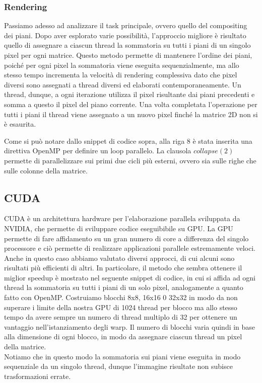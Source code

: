 \documentclass[11pt]{article}
\begin{document}
    \subsubsection{Rendering}
    Passiamo adesso ad analizzare il task principale, ovvero quello del compositing dei piani.
    Dopo aver esplorato varie possibilità, l'approccio migliore è risultato quello di assegnare a ciascun thread la sommatoria su tutti i piani di un singolo pixel per ogni matrice.
    Questo metodo permette di mantenere l'ordine dei piani, poiché per ogni pixel la sommatoria viene eseguita sequenzialmente, ma allo stesso tempo incrementa la velocità di rendering complessiva dato che pixel diversi sono assegnati a thread diversi ed elaborati contemporaneamente.
    Un thread, dunque, a ogni iterazione utilizza il pixel risultante dai piani precedenti e somma a questo il pixel del piano corrente. Una volta completata l'operazione per tutti i piani il thread viene assegnato a un nuovo pixel finché la matrice 2D non si è esaurita.
    
    Come si può notare dallo snippet di codice sopra, alla riga 8 è stata inserita una direttiva OpenMP per definire un loop parallelo. La clausola $collapse(2)$ permette di parallelizzare sui primi due cicli più esterni, ovvero sia sulle righe che sulle colonne della matrice.\\

    \subsection{CUDA}\label{subsec:cuda}
    CUDA è un architettura hardware per l'elaborazione parallela sviluppata da NVIDIA, che permette di sviluppare codice eseguibibile su GPU.
    La GPU permette di fare affidamento su un gran numero di core a differenza del singolo processore e ciò permette di realizzare applicazioni parallele estremamente veloci.\\

    Anche in questo caso abbiamo valutato diversi approcci, di cui alcuni sono risultati più efficienti di altri.
    In particolare, il metodo che sembra ottenere il miglior speedup è mostrato nel seguente snippet di codice, in cui si affida ad ogni thread la sommatoria su tutti i piani di un solo pixel, analogamente a quanto fatto con OpenMP.
    Costruiamo blocchi 8x8, 16x16 0 32x32 in modo da non superare i limite della nostra GPU di 1024 thread per blocco ma allo stesso tempo da avere sempre un numero di thread multiplo di 32 per ottenere un vantaggio nell'istanziamento degli warp.
    Il numero di blocchi varia quindi in base alla dimensione di ogni blocco, in modo da assegnare ciascun thread un pixel della matrice.\\
    
    
    Notiamo che in questo modo la sommatoria sui piani viene eseguita in modo sequenziale da un singolo thread, dunque l'immagine risultate non subisce trasformazioni errate.
\end{document}
